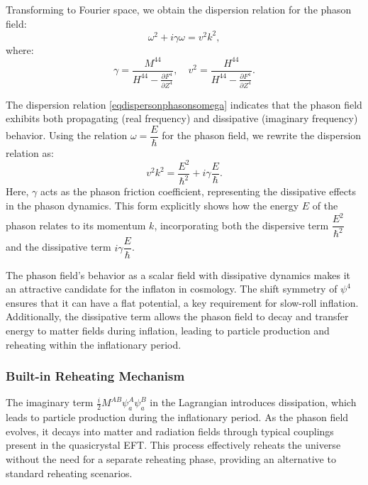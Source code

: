 \documentclass[sn-mathphys-num]{sn-jnl}%
\begin{document}
Transforming to Fourier space, we obtain the dispersion relation for the phason field:
\begin{equation} \omega^2 + i \gamma \omega = v^2 k^2, \label{eqdispersonphasonsomega} \end{equation}
where:
\begin{equation} \gamma = \frac{M^{44}}{H^{44} - \frac{\partial F^4}{\partial Z^4}}, \quad v^2 = \frac{H^{44}}{H^{44} - \frac{\partial F^4}{\partial Z^4}}. \end{equation}

The dispersion relation \eqref{eqdispersonphasonsomega} indicates that the phason field exhibits both propagating (real frequency) and dissipative (imaginary frequency) behavior. Using the relation $\omega = \dfrac{E}{\hbar}$ for the phason field, we rewrite the dispersion relation as:
\begin{equation} v^2 k^2 = \dfrac{E^2}{\hbar^2} + i \gamma \dfrac{E}{\hbar}. \label{eq:phasonrelation} 
\end{equation}
Here, $\gamma$ acts as the phason friction coefficient, representing the dissipative effects in the phason dynamics. This form explicitly shows how the energy $E$ of the phason relates to its momentum $k$, incorporating both the dispersive term $\dfrac{E^2}{\hbar^2}$ and the dissipative term $i \gamma \dfrac{E}{\hbar}$.

The phason field's behavior as a scalar field with dissipative dynamics makes it an attractive candidate for the inflaton in cosmology. The shift symmetry of $\psi^4$ ensures that it can have a flat potential, a key requirement for slow-roll inflation. Additionally, the dissipative term allows the phason field to decay and transfer energy to matter fields during inflation, leading to particle production and reheating within the inflationary period.

\subsubsection{Built-in Reheating Mechanism}

The imaginary term $\frac{i}{2} M^{AB} \psi_a^A \psi_a^B$ in the Lagrangian introduces dissipation, which leads to particle production during the inflationary period. As the phason field evolves, it decays into matter and radiation fields through typical couplings present in the quasicrystal EFT. This process effectively reheats the universe without the need for a separate reheating phase, providing an alternative to standard reheating scenarios.
\end{document}
